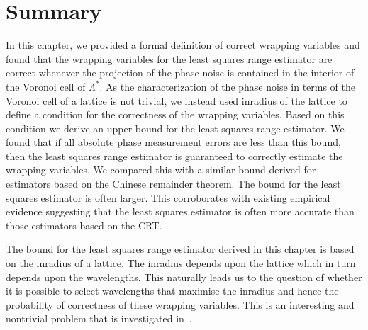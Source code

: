 
\section{Summary}\label{ch4:sec:summary}
In this chapter, we provided a formal definition of correct wrapping variables and found that the wrapping variables for the least squares range estimator are correct whenever the projection of the phase noise is contained in the interior of the Voronoi cell of $\Lambda^*$. As the characterization of the phase noise in terms of the Voronoi cell of a lattice is not trivial, we instead used inradius of the lattice to define a condition for the correctness of the wrapping variables. Based on this condition we derive an upper bound for the least squares range estimator. We found that if all absolute phase measurement errors are less than this bound, then the least squares range estimator is guaranteed to correctly estimate the wrapping variables. We compared this with a similar bound derived for estimators based on the Chinese remainder theorem. The bound for the least squares estimator is often larger. This corroborates with existing empirical evidence suggesting that the least squares estimator is often more accurate than those estimators based on the CRT.


The bound for the least squares range estimator derived in this chapter is based on the inradius of a lattice. The inradius depends upon the lattice which in turn depends upon the wavelengths. This naturally leads us to the question of whether it is possible to select wavelengths that maximise the inradius and hence the probability of correctness of these wrapping variables. This is an interesting and nontrivial problem that is investigated in~.

